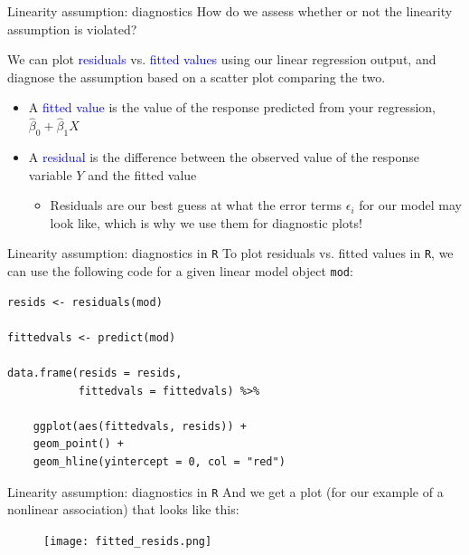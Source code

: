 \documentclass[10pt,t]{beamer}
\begin{document}
\begin{frame}{Linearity assumption: diagnostics}
How do we assess whether or not the linearity assumption is violated?

\vspace{0.3cm}

We can plot \textcolor{blue}{residuals} vs. \textcolor{blue}{fitted values} using our linear regression output, and diagnose the assumption based on a scatter plot comparing the two.

\vspace{0.3cm}

\begin{itemize}
	\item A \textcolor{blue}{fitted value} is the value of the response predicted from your regression, $\hat{\beta}_0 + \hat{\beta}_1 X$
	\medskip
	\item A \textcolor{blue}{residual} is the difference between the observed value of the response variable $Y$ and the fitted value
	\medskip
	\begin{itemize}
		\item[] Residuals are our best guess at what the error terms $\epsilon_i$ for our model may look like, which is why we use them for diagnostic plots!
	\end{itemize}
\end{itemize}
\end{frame}

\begin{frame}[fragile]{Linearity assumption: diagnostics in \texttt{R}}
To plot residuals vs. fitted values in \texttt{R}, we can use the following code for a given linear model object \texttt{mod}:

\vspace{0.2cm}

\begin{lstlisting}
resids <- residuals(mod)

fittedvals <- predict(mod)

data.frame(resids = resids,
           fittedvals = fittedvals) %>%
      
	ggplot(aes(fittedvals, resids)) +
	geom_point() +
	geom_hline(yintercept = 0, col = "red") 
\end{lstlisting}


\end{frame}

\begin{frame}{Linearity assumption: diagnostics in \texttt{R}}
And we get a plot (for our example of a nonlinear association) that looks like this:
\medskip

\begin{figure}
\centering \texttt{[image: fitted\_resids.png]}
\end{figure}

\end{frame}
\end{document}
